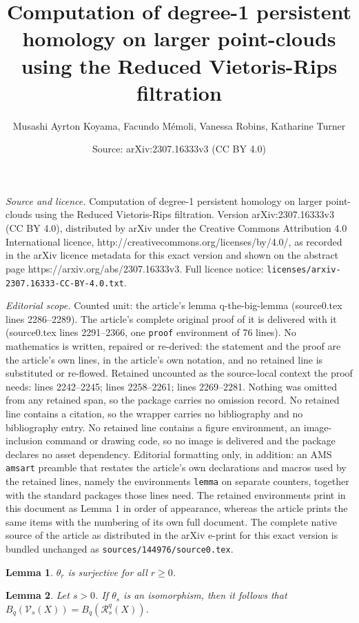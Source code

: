 \documentclass[10pt,a4paper]{amsart}
\title{Computation of degree-1 persistent homology on larger point-clouds using the Reduced Vietoris-Rips filtration}
\author{Musashi Ayrton Koyama, Facundo M\'emoli, Vanessa Robins, Katharine Turner}
\date{Source: arXiv:2307.16333v3 (CC BY 4.0)}
\newtheorem{lemma}{Lemma}
\newcommand\Vr{\mathcal{V}}
\newcommand\rvr{\mathcal{R}}
\begin{document}
\maketitle

\noindent\emph{Source and licence.} Computation of degree-1 persistent homology on larger point-clouds using the Reduced Vietoris-Rips filtration. Version arXiv:2307.16333v3 (CC BY 4.0), distributed by arXiv under the Creative Commons Attribution 4.0 International licence, http://creativecommons.org/licenses/by/4.0/, as recorded in the arXiv licence metadata for this exact version and shown on the abstract page https://arxiv.org/abs/2307.16333v3. Full licence notice: \texttt{licenses/arxiv-2307.16333-CC-BY-4.0.txt}.\par\smallskip

\noindent\textit{Editorial scope.} Counted unit: the article's lemma q-the-big-lemma (source0.tex lines 2286--2289). The article's complete original proof of it is delivered with it (source0.tex lines 2291--2366, one \texttt{proof} environment of 76 lines). No mathematics is written, repaired or re-derived: the statement and the proof are the article's own lines, in the article's own notation, and no retained line is substituted or re-flowed.  Retained uncounted as the source-local context the proof needs: lines 2242--2245; lines 2258--2261; lines 2269--2281.  Nothing was omitted from any retained span, so the package carries no omission record.  No retained line contains a citation, so the wrapper carries no bibliography and no bibliography entry.  No retained line contains a figure environment, an image-inclusion command or drawing code, so no image is delivered and the package declares no asset dependency.  Editorial formatting only, in addition: an AMS \texttt{amsart} preamble that restates the article's own declarations and macros used by the retained lines, namely the environments \texttt{lemma} on separate counters, together with the standard packages those lines need.  The retained environments print in this document as Lemma 1 in order of appearance, whereas the article prints the same items with the numbering of its own full document.  The complete native source of the article as distributed in the arXiv e-print for this exact version is bundled unchanged as \texttt{sources/144976/source0.tex}.
\begin{lemma}
\label{q-theta-is-surjective}
    $\theta_{r}$ is surjective for all $r \geq 0$. 
\end{lemma}

\begin{lemma}
\label{q-isomorphism-inclusions}
    Let $s > 0$. If $\theta_{s}$ is an isomorphism, then it follows that $B_{q}(\Vr_{s}(X)) = B_{q}(\rvr^{q}_{s}(X))$. 
\end{lemma}
\end{document}
